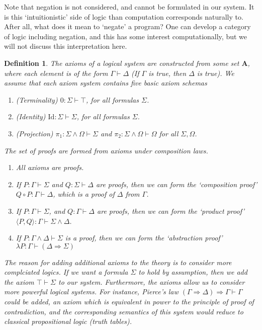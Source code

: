 \documentclass{article}
\theoremstyle{plain}
\newtheorem{definition}{Definition}
\begin{document}
Note that negation is not considered, and cannot be formulated in our system. It is this `intuitionistic' side of logic than computation corresponds naturally to. After all, what does it mean to `negate' a program? One can develop a category of logic including negation, and this has some interest computationally, but we will not discuss this interpretation here.

\begin{definition}
    The axioms of a logical system are constructed from some set $\mathbf{A}$, where each element is of the form $\Gamma \vdash \Delta$ (If $\Gamma$ is true, then $\Delta$ is true). We assume that each axiom system contains five basic axiom schemas
    \begin{enumerate}
        \item(Terminality) $0: \Sigma \vdash \top$, for all formulas $\Sigma$.
        \item(Identity) $\text{Id}: \Sigma \vdash \Sigma$, for all formulas $\Sigma$.
        \item(Projection) $\pi_1: \Sigma \wedge \Omega \vdash \Sigma$ and $\pi_2: \Sigma \wedge \Omega \vdash \Omega$ for all $\Sigma, \Omega$.
    \end{enumerate}
    The set of proofs are formed from axioms under composition laws.
    \begin{enumerate}
        \item All axioms are proofs.
        \item If $P: \Gamma \vdash \Sigma$ and $Q: \Sigma \vdash \Delta$ are proofs, then we can form the `composition proof' $Q \circ P: \Gamma \vdash \Delta$, which is a proof of $\Delta$ from $\Gamma$.
        \item If $P: \Gamma \vdash \Sigma$, and $Q: \Gamma \vdash \Delta$ are proofs, then we can form the `product proof' $\langle P,Q \rangle: \Gamma \vdash \Sigma \wedge \Delta$.
        \item If $P: \Gamma \wedge \Delta \vdash \Sigma$ is a proof, then we can form the `abstraction proof' $\lambda P: \Gamma \vdash (\Delta \Rightarrow \Sigma)$
    \end{enumerate}
    The reason for adding additional axioms to the theory is to consider more complciated logics. If we want a formula $\Sigma$ to hold by assumption, then we add the axiom $\top \vdash \Sigma$ to our system. Furthermore, the axioms allow us to consider more powerful logical systems. For instance, Pierce's law $(\Gamma \Rightarrow \Delta) \Rightarrow \Gamma \vdash \Gamma$ could be added, an axiom which is equivalent in power to the principle of proof of contradiction, and the corresponding semantics of this system would reduce to classical propositional logic (truth tables).
\end{definition}
\end{document}
